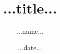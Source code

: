 \documentclass{article}
\begin{document}
\title{...title...}
\author{...name...}
\date{...date...}
\maketitle

\newpage

\end{document}
